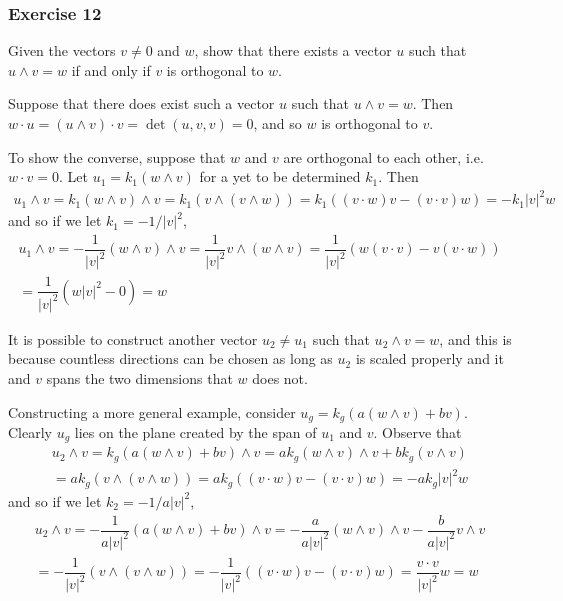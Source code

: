 \documentclass{article}
\begin{document}
	\subsubsection*{Exercise 12}
	Given the vectors $v \neq 0$ and $w$, show that there exists a vector $u$ such that $u \wedge v = w$ if and only if $v$ is orthogonal to $w$.
	
	Suppose that there does exist such a vector $u$ such that $u \wedge v = w$. Then $w \cdot u = (u \wedge v) \cdot v = \det(u, v, v) = 0$, and so $w$ is orthogonal to $v$.
	
	To show the converse, suppose that $w$ and $v$ are orthogonal to each other, i.e. $w \cdot v = 0$. Let $u_1 = k_1(w \wedge v)$ for a yet to be determined $k_1$. Then
	\begin{gather*}
		u_1 \wedge v = k_1(w \wedge v) \wedge v = k_1 (v \wedge (v \wedge w)) = k_1 ((v \cdot w)v - (v \cdot v)w) = -k_1 |v|^2 w
	\end{gather*}
	and so if we let $k_1 = -1/|v|^2$, 
	\begin{gather*}
		u_1 \wedge v = -\dfrac{1}{|v|^2} (w \wedge v) \wedge v = \dfrac{1}{|v|^2} v \wedge (w \wedge v) = \dfrac{1}{|v|^2} (w(v \cdot v) - v(v \cdot w)) \\
		= \dfrac{1}{|v|^2} (w |v|^2 - 0) = w
	\end{gather*}
	
	It is possible to construct another vector $u_2 \neq u_1$ such that $u_2 \wedge v = w$, and this is because countless directions can be chosen as long as $u_2$ is scaled properly and it and $v$ spans the two dimensions that $w$ does not.
	
	Constructing a more general example, consider $u_g = k_g (a(w \wedge v) + bv)$. Clearly $u_g$ lies on the plane created by the span of $u_1$ and $v$. Observe that
	\begin{gather*}
		u_2 \wedge v = k_g(a(w \wedge v) + bv) \wedge v = ak_g(w \wedge v) \wedge v + bk_g (v \wedge v) \\
		= ak_g (v \wedge (v \wedge w)) = ak_g ((v \cdot w)v - (v \cdot v)w) = -ak_g |v|^2 w
	\end{gather*}
	and so if we let $k_2 = -1/a|v|^2$,
	\begin{gather*}
		u_2 \wedge v = -\dfrac{1}{a|v|^2} (a(w \wedge v) + bv) \wedge v = -\dfrac{a}{a|v|^2} (w \wedge v) \wedge v - \dfrac{b}{a|v|^2} v \wedge v \\
		= -\dfrac{1}{|v|^2} (v \wedge (v \wedge w)) = -\dfrac{1}{|v|^2} ((v \cdot w)v - (v \cdot v)w) = \dfrac{v \cdot v}{|v|^2} w = w
	\end{gather*}
	
\end{document}
